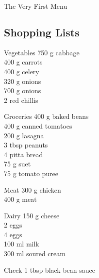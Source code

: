 
    
		\begin{menu}{The Very First Menu}
    
    \subsection*{Shopping Lists}
      \begin{shoppinglist}{Vegetables}
      750 g cabbage \\ 
      400 g carrots \\ 
      400 g celery \\ 
      320 g onions \\ 
      700 g onions \\ 
      2  red chillis \\ 
      \end{shoppinglist}%
      \hfil%
      \begin{shoppinglist}{Groceries}
      400 g baked beans \\ 
      400 g canned tomatoes \\ 
      200 g lasagna \\ 
      3 tbsp peanuts \\ 
      4  pitta bread \\ 
      75 g suet \\ 
      75 g tomato puree \\ 
      \end{shoppinglist}%
      \par %
      \begin{shoppinglist}{Meat}
      300 g chicken \\ 
      400 g meat \\ 
      \end{shoppinglist}%
      \begin{shoppinglist}{Dairy}
      150 g cheese \\ 
      2  eggs \\ 
      4  eggs \\ 
      100 ml milk \\ 
      300 ml soured cream \\ 
      \end{shoppinglist}%
      \par %
      \clearpage %
      \begin{shoppinglist}{Check}
      1 tbsp black bean sauce \\ 

\end{shoppinglist}
\end{menu}
